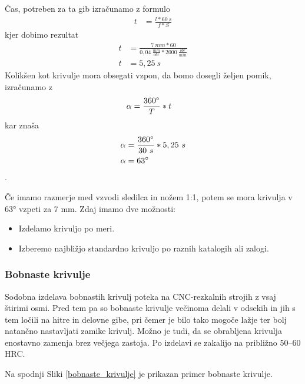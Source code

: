 Čas, potreben za ta gib izračunamo z formulo
\begin{equation}
	\begin{split}
		t &= \frac{l*60\ s}{f*S}
	\end{split}
\end{equation}
kjer dobimo rezultat
\begin{equation*}
	\begin{split}
		t &= \frac{7\ mm*60}{0,04\ \frac{mm}{obr}*2000\ \frac{obr}{min}} \\
		t &= 5,25\ s
	\end{split}
\end{equation*}
Kolikšen kot krivulje mora obsegati vzpon, da bomo
dosegli željen pomik, izračunamo z
\begin{equation}
	\begin{split}
		\alpha &= \frac{360\degree}{T} * t
	\end{split}
\end{equation}
kar znaša
\begin{equation*}
	\begin{split}
		\alpha &= \frac{360\degree}{30\ s} * 5,25\ s \\
		\alpha &= 63\degree
	\end{split}
\end{equation*}.

Če imamo razmerje med vzvodi sledilca in nožem 1:1, potem se mora krivulja v 63° vzpeti za 7 mm.
Zdaj imamo dve možnosti:
\begin{itemize}
	\item Izdelamo krivuljo po meri.
	\item Izberemo najbližjo standardno krivuljo po raznih katalogih ali zalogi.
\end{itemize}

\subsubsection{Bobnaste krivulje}
Sodobna izdelava bobnastih krivulj poteka na CNC-rezkalnih strojih
z vsaj štirimi osmi. Pred tem pa so bobnaste krivulje večinoma delali v
odsekih in jih s tem ločili na hitre in delovne gibe, pri čemer je bilo tako
mogoče lažje ter bolj natančno nastavljati zamike krivulj.
Možno je tudi, da se obrabljena krivulja enostavno zamenja brez
večjega zastoja. Po izdelavi se zakalijo na približno 50--60 HRC.

Na spodnji Sliki \ref{bobnaste_krivulje} je prikazan primer
bobnaste krivulje.

